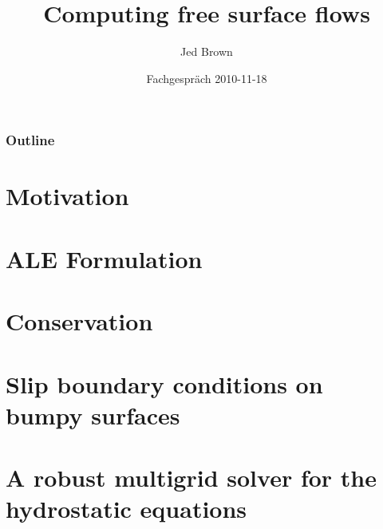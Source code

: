 \documentclass{beamer}
\title{Computing free surface flows}
\author{Jed Brown}
\institute[ETH Z\"urich]
{
  Laboratory of Hydrology, Hydraulics, and Glaciology \\
  ETH Z\"urich
}
\date[2010-11-18]{Fachgespr\"ach 2010-11-18}
\begin{document}
\lstset{language=C}
\normalem

\begin{frame}
\titlepage
\end{frame}

\begin{frame}
  \frametitle{Outline}
  \tableofcontents
\end{frame}

\section{Motivation}







\section{ALE Formulation}

%



\section{Conservation}


\section[Slip]{Slip boundary conditions on bumpy surfaces}


\section[Hydrostatic]{A robust multigrid solver for the hydrostatic equations}




\end{document}
